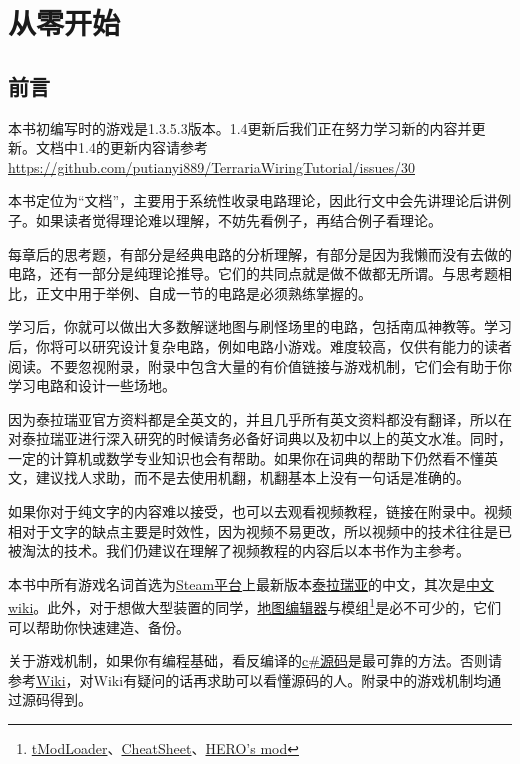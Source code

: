 \chapter{从零开始}

\section{前言}\label{sec1:1}
\begin{note}
本书初编写时的游戏是1.3.5.3版本。1.4更新后我们正在努力学习新的内容并更新。文档中1.4的更新内容请参考\url{https://github.com/putianyi889/TerrariaWiringTutorial/issues/30}
\end{note}

本书定位为“文档”，主要用于系统性收录电路理论，因此行文中会先讲理论后讲例子。如果读者觉得理论难以理解，不妨先看例子，再结合例子看理论。

每章后的思考题，有部分是经典电路的分析理解，有部分是因为我懒而没有去做的电路，还有一部分是纯理论推导。它们的共同点就是做不做都无所谓。与思考题相比，正文中用于举例、自成一节的电路是必须熟练掌握的。

学习后，你就可以做出大多数解谜地图与刷怪场里的电路，包括南瓜神教等。学习后，你将可以研究设计复杂电路，例如电路小游戏。难度较高，仅供有能力的读者阅读。不要忽视附录，附录中包含大量的有价值链接与游戏机制，它们会有助于你学习电路和设计一些场地。

因为泰拉瑞亚官方资料都是全英文的，并且几乎所有英文资料都没有翻译，所以在对泰拉瑞亚进行深入研究的时候请务必备好词典以及初中以上的英文水准。同时，一定的计算机或数学专业知识也会有帮助。如果你在词典的帮助下仍然看不懂英文，建议找人求助，而不是去使用机翻，机翻基本上没有一句话是准确的。

如果你对于纯文字的内容难以接受，也可以去观看视频教程，链接在附录中。视频相对于文字的缺点主要是时效性，因为视频不易更改，所以视频中的技术往往是已被淘汰的技术。我们仍建议在理解了视频教程的内容后以本书作为主参考。

本书中所有游戏名词首选为\href{https://store.steampowered.com/}{Steam平台}上最新版本\href{https://store.steampowered.com/app/105600/Terraria/}{泰拉瑞亚}的中文，其次是\href{https://terraria-zh.gamepedia.com/index.php?title=Terraria_Wiki&variant=zh}{中文wiki}。此外，对于想做大型装置的同学，\hyperref[app3]{地图编辑器}与模组\footnote{\hyperref[app4]{tModLoader}、\hyperref[app5]{CheatSheet}、\hyperref[app6]{HERO's mod}}是必不可少的，它们可以帮助你快速建造、备份。

关于游戏机制，如果你有编程基础，看反编译的\hyperref[app8]{c\#源码}是最可靠的方法。否则请参考\hyperref[app2]{Wiki}，对Wiki有疑问的话再求助可以看懂源码的人。附录中的游戏机制均通过源码得到。

